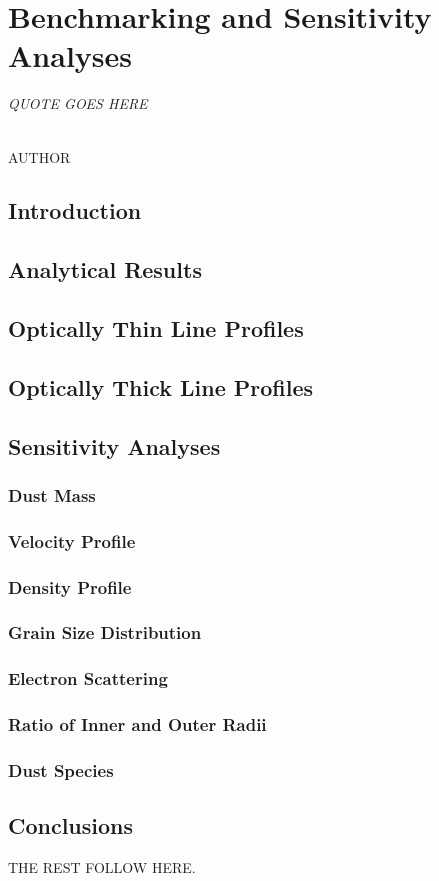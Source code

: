 \chapter{Benchmarking and Sensitivity Analyses}\label{chp:chp3}

\begin{flushright}
  {\em QUOTE GOES HERE }\\

\ \

\normalsize
{AUTHOR}  
\end{flushright}

\section{Introduction}
\section{Analytical Results}
\section{Optically Thin Line Profiles}
\section{Optically  Thick Line Profiles}
\section{Sensitivity Analyses}
	\subsection{Dust Mass}
	\subsection{Velocity Profile}
	\subsection{Density Profile}
	\subsection{Grain Size Distribution}
	\subsection{Electron Scattering}
	\subsection{Ratio of Inner and Outer Radii}
	\subsection{Dust Species}
\section{Conclusions}


THE REST FOLLOW HERE. 



